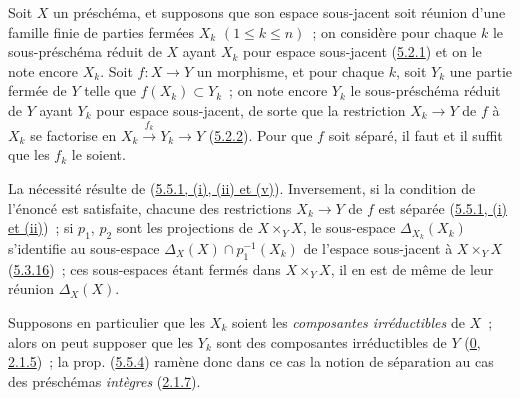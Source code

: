 \begin{proposition}[5.5.4]
\label{I.5.5.4-fr}
Soit $X$ un préschéma, et supposons que son espace sous-jacent soit réunion
d'une famille finie de parties fermées $X_k$ $(1\leq k\leq n)$~; on considère
pour chaque $k$ le sous-préschéma réduit de $X$ ayant $X_k$ pour espace
sous-jacent (\hyperref[I.5.2.1-fr]{5.2.1}) et on le note encore $X_k$. Soit
$f:X\to Y$ un morphisme, et pour chaque $k$, soit $Y_k$ une partie fermée de
$Y$ telle que $f(X_k)\subset Y_k$~; on note encore $Y_k$ le sous-préschéma
réduit de $Y$ ayant $Y_k$ pour espace sous-jacent, de sorte que la restriction
$X_k\to Y$ de $f$ à $X_k$ se factorise en
$X_k\xrightarrow{f_k}Y_k\to Y$ (\hyperref[I.5.2.2-fr]{5.2.2}). Pour que $f$
soit séparé, il faut et il suffit que les $f_k$ le soient.
\end{proposition}

La nécessité résulte de
(\hyperref[I.5.5.1-fr]{5.5.1, (i), (ii) et (v)}). Inversement, si la condition
de l'énoncé est satisfaite, chacune des restrictions $X_k\to Y$ de $f$ est
séparée (\hyperref[I.5.5.1-fr]{5.5.1, (i) et (ii)})~; si $p_1$, $p_2$ sont les
projections de $X\times_Y X$, le sous-espace $\Delta_{X_k}(X_k)$ s'identifie
au sous-espace $\Delta_X(X)\cap p_1^{-1}(X_k)$ de l'espace sous-jacent à
$X\times_Y X$ (\hyperref[I.5.3.16-fr]{5.3.16})~; ces sous-espaces étant
fermés dans $X\times_Y X$, il en est de même de leur réunion $\Delta_X(X)$.

Supposons en particulier que les $X_k$ soient les
\emph{composantes irréductibles} de $X$~; alors on peut supposer que les $Y_k$
sont des composantes irréductibles de $Y$
(\hyperref[0.2.1.5-fr]{0, 2.1.5})~; la prop.
(\hyperref[I.5.5.4-fr]{5.5.4}) ramène donc dans ce cas la notion de séparation
au cas des préschémas \emph{intègres} (\hyperref[I.2.1.7-fr]{2.1.7}).

